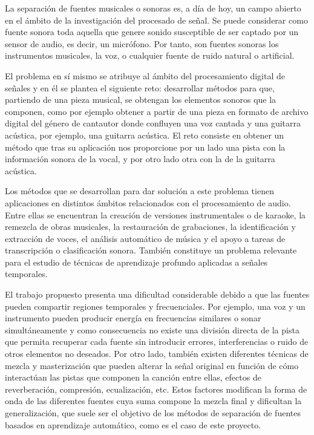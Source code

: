 La separación de fuentes musicales o sonoras es, a día de hoy, un campo abierto en el ámbito de la investigación del procesado de señal. Se puede considerar como fuente sonora toda aquella que genere sonido susceptible de ser captado por un sensor de audio, es decir,
un micrófono. Por tanto, son fuentes sonoras los instrumentos musicales, la voz, o cualquier fuente de ruido natural o artificial.


El problema en sí mismo se atribuye al ámbito del procesamiento digital de señales y en él se plantea el siguiente reto: desarrollar métodos para que, partiendo de una pieza musical, se obtengan los elementos sonoros que la componen, como por ejemplo obtener a partir de una pieza en formato de archivo digital
del género de cantautor donde confluyen una voz cantada y una guitarra acústica, por ejemplo, una guitarra acústica. El reto consiste en  obtener un método que tras su aplicación nos proporcione por un lado una pista con la información sonora de la vocal, y por otro lado otra con la de la guitarra acústica.  

Los métodos que se desarrollan para dar solución a este problema tienen aplicaciones en distintos ámbitos relacionados con el procesamiento de audio. Entre ellas se encuentran la creación de versiones instrumentales o de karaoke, la remezcla de obras musicales, la restauración de grabaciones, la identificación y extracción de voces, el análisis automático de música y el apoyo a tareas de transcripción o clasificación sonora. También constituye un problema relevante para el estudio de técnicas de aprendizaje profundo aplicadas a señales temporales.

El trabajo propuesto presenta una dificultad considerable debido a que las fuentes pueden compartir regiones temporales y frecuenciales. Por ejemplo, una voz y un instrumento pueden producir energía en frecuencias similares o sonar simultáneamente y como consecuencia no existe una división directa de la pista que permita recuperar cada fuente sin introducir errores, interferencias o ruido de otros elementos no deseados. Por otro lado, también 
existen diferentes técnicas de mezcla y masterización que pueden alterar la señal original en función de cómo interactúan las pistas que componen la canción entre ellas, efectos de reverberación, compresión, ecualización, etc. Estos factores modifican la forma de onda de las diferentes fuentes cuya suma compone la mezcla final y dificultan la generalización, que suele ser el objetivo de los métodos de separación de fuentes basados en aprendizaje automático, como es el caso de este proyecto.

